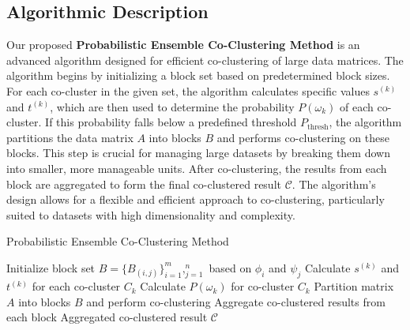 \subsection{Algorithmic Description}
Our proposed \textbf{Probabilistic Ensemble Co-Clustering Method} is an advanced algorithm designed for efficient co-clustering of large data matrices. The algorithm begins by initializing a block set based on predetermined block sizes. For each co-cluster in the given set, the algorithm calculates specific values $s^{(k)}$ and $t^{(k)}$, which are then used to determine the probability $P(\omega_k)$ of each co-cluster. If this probability falls below a predefined threshold $P_{\text{thresh}}$, the algorithm partitions the data matrix $A$ into blocks $B$ and performs co-clustering on these blocks. This step is crucial for managing large datasets by breaking them down into smaller, more manageable units. After co-clustering, the results from each block are aggregated to form the final co-clustered result $\mathcal{C}$. The algorithm's design allows for a flexible and efficient approach to co-clustering, particularly suited to datasets with high dimensionality and complexity.

\begin{algorithm}[!t]
    \caption{Probabilistic Ensemble Co-Clustering Method}\label{alg:method}
    \begin{algorithmic}[1]
        \STATE Initialize block set $B = \{B_{(i,j)}\}_{i=1}^m,_{j=1}^n$ based on $\phi_i$ and $\psi_j$
        \STATE Calculate $s^{(k)}$ and $t^{(k)}$ for each co-cluster $C_k$
            \STATE Calculate $P(\omega_k)$ for co-cluster $C_k$
                \STATE Partition matrix $A$ into blocks $B$ and perform co-clustering
                \STATE Aggregate co-clustered results from each block
            \ENDIF
        \ENDFOR
        \RETURN Aggregated co-clustered result $\mathcal{C}$
    \end{algorithmic}
\end{algorithm}
